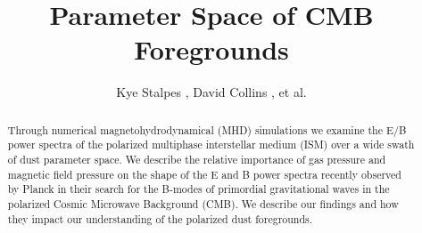 \title{Parameter Space of CMB Foregrounds}
\author{Kye Stalpes , David Collins
, et al.}


\begin{abstract}
Through numerical magnetohydrodynamical (MHD) simulations we examine the E/B
power spectra of the polarized multiphase interstellar medium (ISM) over a wide
swath of dust parameter space. We describe the relative importance of gas
pressure and magnetic field pressure on the shape of the E and B power spectra
recently observed by Planck in their search for the B-modes of primordial
gravitational waves in the polarized Cosmic Microwave Background (CMB). We describe our findings and how they impact our
understanding of the polarized dust foregrounds.
\end{abstract}

